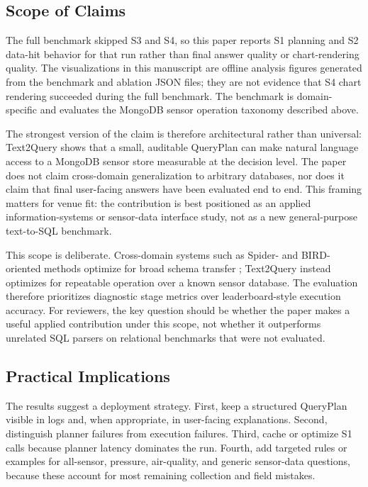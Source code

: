 \documentclass[11pt]{article}
\begin{document}
\subsection{Scope of Claims}

The full benchmark skipped S3 and S4, so this paper reports S1 planning and S2 data-hit behavior for that run rather than final answer quality or chart-rendering quality. The visualizations in this manuscript are offline analysis figures generated from the benchmark and ablation JSON files; they are not evidence that S4 chart rendering succeeded during the full benchmark. The benchmark is domain-specific and evaluates the MongoDB sensor operation taxonomy described above.

The strongest version of the claim is therefore architectural rather than universal: Text2Query shows that a small, auditable QueryPlan can make natural language access to a MongoDB sensor store measurable at the decision level. The paper does not claim cross-domain generalization to arbitrary databases, nor does it claim that final user-facing answers have been evaluated end to end. This framing matters for venue fit: the contribution is best positioned as an applied information-systems or sensor-data interface study, not as a new general-purpose text-to-SQL benchmark.

This scope is deliberate. Cross-domain systems such as Spider- and BIRD-oriented methods optimize for broad schema transfer \cite{yu2018spider,li2023bird}; Text2Query instead optimizes for repeatable operation over a known sensor database. The evaluation therefore prioritizes diagnostic stage metrics over leaderboard-style execution accuracy. For reviewers, the key question should be whether the paper makes a useful applied contribution under this scope, not whether it outperforms unrelated SQL parsers on relational benchmarks that were not evaluated.

\subsection{Practical Implications}

The results suggest a deployment strategy. First, keep a structured QueryPlan visible in logs and, when appropriate, in user-facing explanations. Second, distinguish planner failures from execution failures. Third, cache or optimize S1 calls because planner latency dominates the run. Fourth, add targeted rules or examples for all-sensor, pressure, air-quality, and generic sensor-data questions, because these account for most remaining collection and field mistakes.
\end{document}
